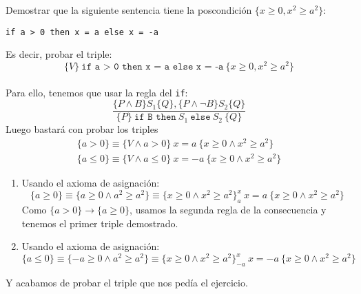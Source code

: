 \begin{ejercicio}
    Demostrar que la siguiente sentencia tiene la poscondición ${\{x\geq 0, x^2\geq a^2\}}$:
    \begin{center}
        \verb|if a > 0 then x = a else x = -a|
    \end{center}
    Es decir, probar el triple:
    \begin{equation*}
        \{V\}\ \texttt{if a >\ 0 then x = a else x = -a}\ \{x\geq 0, x^2\geq a^2\}
    \end{equation*}~\\
    Para ello, tenemos que usar la regla del \verb|if|:
    \begin{equation*}
        \dfrac{\{P\land B\}S_1\{Q\}, \{P\land \lnot B\}S_2\{Q\}}{\{P\}\ \texttt{if B then}\ S_1\ \texttt{else}\ S_2\ \{Q\}}
    \end{equation*}
    Luego bastará con probar los triples
    \begin{gather*}
        \{a>0\} \equiv \{V \land a > 0\}\ x=a\ \{x\geq 0 \land x^2\geq a^2\} \\
        \{a\leq 0\} \equiv \{V \land a \leq 0\}\ x=-a\ \{x\geq 0 \land x^2\geq a^2\}
    \end{gather*}
    \begin{enumerate}
        \item Usando el axioma de asignación:
            \begin{equation*}
                \{a \geq 0\} \equiv \{a \geq 0 \land a^2 \geq a^2\} \equiv \{x\geq 0 \land x^2\geq a^2\}^x_{a}\ x=a\ \{x\geq 0 \land x^2\geq a^2\}
            \end{equation*}
            Como $\{a>0\}\rightarrow\{a\geq 0\}$, usamos la segunda regla de la consecuencia y tenemos el primer triple demostrado.
        \item Usando el axioma de asignación:
            \begin{equation*}
                \{a \leq 0\} \equiv \{-a \geq 0 \land a^2 \geq a^2\} \equiv \{x\geq 0 \land x^2\geq a^2\}^x_{-a}\ x=-a\ \{x\geq 0 \land x^2\geq a^2\}
            \end{equation*}
    \end{enumerate}
    Y acabamos de probar el triple que nos pedía el ejercicio.
\end{ejercicio}

